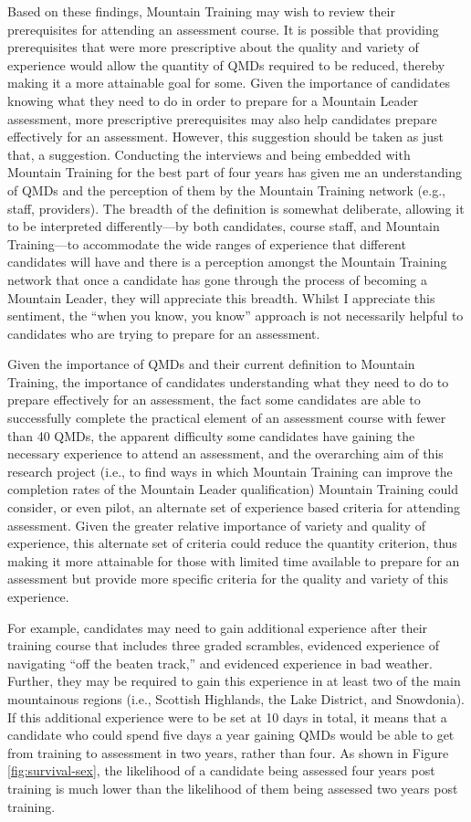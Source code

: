 \documentclass[
  12pt,
  a4paper,
]{book}
\begin{document}
Based on these findings, Mountain Training may wish to review their prerequisites for attending an assessment course. It is possible that providing prerequisites that were more prescriptive about the quality and variety of experience would allow the quantity of QMDs required to be reduced, thereby making it a more attainable goal for some. Given the importance of candidates knowing what they need to do in order to prepare for a Mountain Leader assessment, more prescriptive prerequisites may also help candidates prepare effectively for an assessment. However, this suggestion should be taken as just that, a suggestion. Conducting the interviews and being embedded with Mountain Training for the best part of four years has given me an understanding of QMDs and the perception of them by the Mountain Training network (e.g., staff, providers). The breadth of the definition is somewhat deliberate, allowing it to be interpreted differently---by both candidates, course staff, and Mountain Training---to accommodate the wide ranges of experience that different candidates will have and there is a perception amongst the Mountain Training network that once a candidate has gone through the process of becoming a Mountain Leader, they will appreciate this breadth. Whilst I appreciate this sentiment, the ``when you know, you know'' approach is not necessarily helpful to candidates who are trying to prepare for an assessment.

Given the importance of QMDs and their current definition to Mountain Training, the importance of candidates understanding what they need to do to prepare effectively for an assessment, the fact some candidates are able to successfully complete the practical element of an assessment course with fewer than 40 QMDs, the apparent difficulty some candidates have gaining the necessary experience to attend an assessment, and the overarching aim of this research project (i.e., to find ways in which Mountain Training can improve the completion rates of the Mountain Leader qualification) Mountain Training could consider, or even pilot, an alternate set of experience based criteria for attending assessment. Given the greater relative importance of variety and quality of experience, this alternate set of criteria could reduce the quantity criterion, thus making it more attainable for those with limited time available to prepare for an assessment but provide more specific criteria for the quality and variety of this experience.

For example, candidates may need to gain additional experience after their training course that includes three graded scrambles, evidenced experience of navigating ``off the beaten track,'' and evidenced experience in bad weather. Further, they may be required to gain this experience in at least two of the main mountainous regions (i.e., Scottish Highlands, the Lake District, and Snowdonia). If this additional experience were to be set at 10 days in total, it means that a candidate who could spend five days a year gaining QMDs would be able to get from training to assessment in two years, rather than four. As shown in Figure \ref{fig:survival-sex}, the likelihood of a candidate being assessed four years post training is much lower than the likelihood of them being assessed two years post training.
\end{document}
